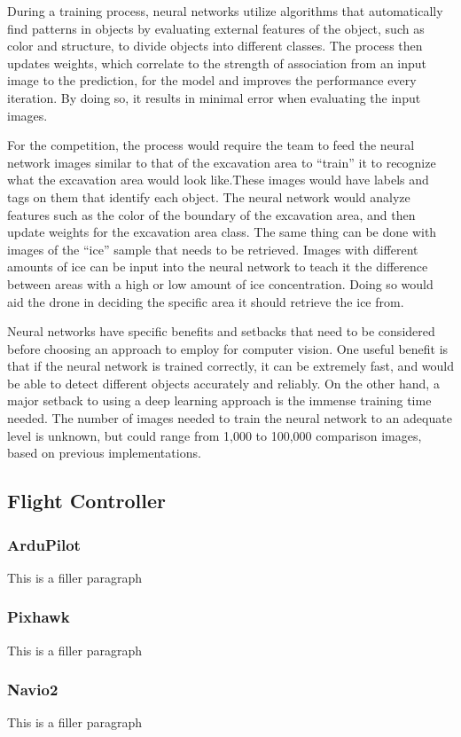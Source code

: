 		During a training process, neural networks utilize algorithms that automatically find patterns in objects by evaluating external features of the object, such as color and structure, to divide objects into different classes. The process then updates weights, which correlate to the strength of association from an input image to the prediction, for the model and improves the performance every iteration. By doing so, it results in minimal error when evaluating the input images.
		
		For the competition, the process would require the team to feed the neural network images similar to that of the excavation area to “train” it to recognize what the excavation area would look like.These images would have labels and tags on them that identify each object. The neural network would analyze features such as the color of the boundary of the excavation area, and then update weights for the excavation area class. The same thing can be done with images of the “ice” sample that needs to be retrieved. Images with different amounts of ice can be input into the neural network to teach it the difference between areas with a high or low amount of ice concentration. Doing so would aid the drone in deciding the specific area it should retrieve the ice from.
		
		Neural networks have specific benefits and setbacks that need to be considered before choosing an approach to employ for computer vision. One useful benefit is that if the neural network is trained correctly, it can be extremely fast, and would be able to detect different objects accurately and reliably. On the other hand, a major setback to using a deep learning approach is the immense training time needed. The number of images needed to train the neural network to an adequate level is unknown, but could range from 1,000 to 100,000 comparison images, based on previous implementations.

	\subsection{Flight Controller}
		\subsubsection{ArduPilot}
			This is a filler paragraph

		\subsubsection{Pixhawk}
			This is a filler paragraph

		\subsubsection{Navio2}
			This is a filler paragraph